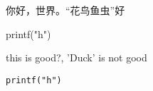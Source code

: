 \documentclass[a4paper,12pt]{article}
\begin{document}
你好，世界。“花鸟鱼虫”好

printf("h")

this is good?, 'Duck' is not good

\verb|printf("h")|
\end{document}

